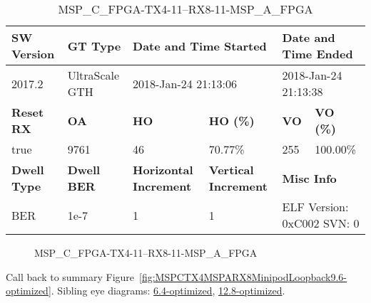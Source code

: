 \begin{table}[h]
\centering
\caption{MSP\_C\_FPGA-TX4-11--RX8-11-MSP\_A\_FPGA}
\label{tab:MSPCFPGATX411RX811MSPAFPGA9.6-optimized}
\begin{tabular}{@{}|l|l|l|l|l|l|@{}}
\toprule
\textbf{SW Version}                & \textbf{GT Type}   & \multicolumn{2}{l|}{\textbf{Date and Time Started}}            & \multicolumn{2}{l|}{\textbf{Date and Time Ended}}        \\ \midrule
2017.2                       & UltraScale GTH          & \multicolumn{2}{l|}{2018-Jan-24 21:13:06}                   & \multicolumn{2}{l|}{2018-Jan-24 21:13:38}               \\ \midrule
\textbf{Reset RX}                  & \textbf{OA} & \textbf{HO}   & \textbf{HO (\%)} & \textbf{VO} & \textbf{VO (\%)} \\ \midrule
true & 9761        & 46          & 70.77\%        & 255        & 100.00\%       \\ \midrule
\textbf{Dwell Type}                & \textbf{Dwell BER} & \textbf{Horizontal Increment} & \textbf{Vertical Increment}    & \multicolumn{2}{l|}{\textbf{Misc Info}}                  \\ \midrule
BER                            & 1e-7        & 1        & 1           & \multicolumn{2}{l|}{ELF Version: 0xC002 SVN: 0}                         \\ \bottomrule
\end{tabular}
\end{table}

\begin{figure}[h]
\caption{MSP\_C\_FPGA-TX4-11--RX8-11-MSP\_A\_FPGA} \label{fig:MSPCFPGATX411RX811MSPAFPGA9.6-optimized}
\end{figure}

Call back to summary Figure~\ref{fig:MSPCTX4MSPARX8MinipodLoopback9.6-optimized}.
Sibling eye diagrams: \hyperref[sec:MSPCFPGATX411RX811MSPAFPGA6.4-optimized]{6.4-optimized}, \hyperref[sec:MSPCFPGATX411RX811MSPAFPGA12.8-optimized]{12.8-optimized}.

\clearpage
\newpage

